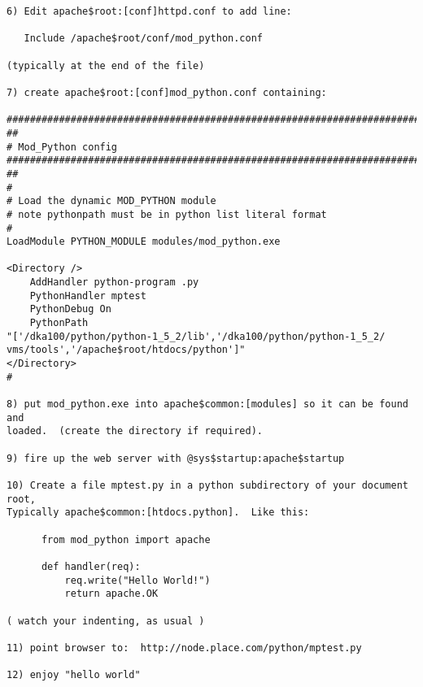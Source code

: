 \begin{verbatim}
6) Edit apache$root:[conf]httpd.conf to add line:

   Include /apache$root/conf/mod_python.conf

(typically at the end of the file)

7) create apache$root:[conf]mod_python.conf containing:

############################################################################
##
# Mod_Python config
############################################################################
##
#
# Load the dynamic MOD_PYTHON module
# note pythonpath must be in python list literal format
#
LoadModule PYTHON_MODULE modules/mod_python.exe

<Directory />
    AddHandler python-program .py
    PythonHandler mptest
    PythonDebug On
    PythonPath
"['/dka100/python/python-1_5_2/lib','/dka100/python/python-1_5_2/
vms/tools','/apache$root/htdocs/python']"
</Directory>
#

8) put mod_python.exe into apache$common:[modules] so it can be found and
loaded.  (create the directory if required).  

9) fire up the web server with @sys$startup:apache$startup

10) Create a file mptest.py in a python subdirectory of your document root,  
Typically apache$common:[htdocs.python].  Like this:

      from mod_python import apache

      def handler(req):
          req.write("Hello World!")
          return apache.OK 

( watch your indenting, as usual )

11) point browser to:  http://node.place.com/python/mptest.py

12) enjoy "hello world"
\end{verbatim}
